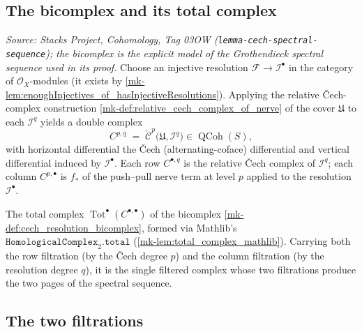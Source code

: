 \subsection{The bicomplex and its total complex}

\begin{definition}
  \label{mk-def:cech_resolution_bicomplex}
  \textit{Source: Stacks Project, Cohomology, Tag 03OW
  (\texttt{lemma-cech-spectral-sequence}); the bicomplex is the explicit model of the
  Grothendieck spectral sequence used in its proof.}
  Choose an injective resolution \(\mathcal{F} \to \mathcal{I}^\bullet\) in the
  category of \(\mathcal{O}_X\)-modules (it exists by
  \ref{mk-lem:enoughInjectives_of_hasInjectiveResolutions}). Applying the relative
  {\v C}ech-complex construction \ref{mk-def:relative_cech_complex_of_nerve} of the cover
  \(\mathfrak{U}\) to each \(\mathcal{I}^q\) yields a double complex
  \[
    C^{p,q} \;=\; \check{\mathcal{C}}^p\bigl(\mathfrak{U}, \mathcal{I}^q\bigr)
    \in \operatorname{QCoh}(S),
  \]
  with horizontal differential the {\v C}ech (alternating-coface) differential and
  vertical differential induced by \(\mathcal{I}^\bullet\). Each row \(C^{\bullet,q}\)
  is the relative {\v C}ech complex of \(\mathcal{I}^q\); each column \(C^{p,\bullet}\)
  is \(f_*\) of the push--pull nerve term at level \(p\) applied to the resolution
  \(\mathcal{I}^\bullet\).
\end{definition}

\begin{definition}
  \label{mk-def:cech_resolution_total_complex}
  The total complex \(\operatorname{Tot}^\bullet(C^{\bullet,\bullet})\) of the
  bicomplex \ref{mk-def:cech_resolution_bicomplex}, formed via Mathlib's
  \(\texttt{HomologicalComplex}_2.\texttt{total}\)
  (\ref{mk-lem:total_complex_mathlib}). Carrying both the row filtration (by the
  {\v C}ech degree \(p\)) and the column filtration (by the resolution degree \(q\)),
  it is the single filtered complex whose two filtrations produce the two pages of the
  spectral sequence.
\end{definition}

\subsection{The two filtrations}


